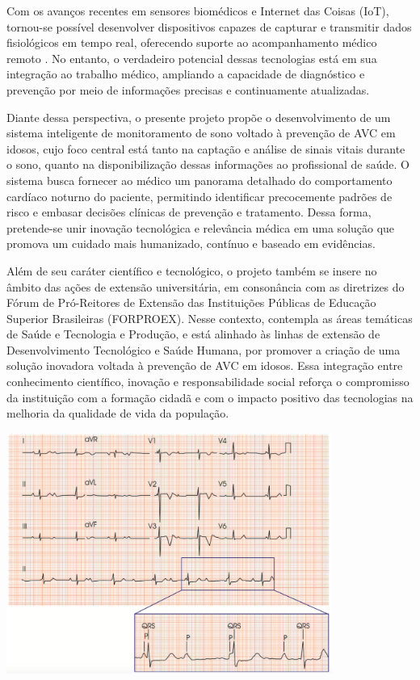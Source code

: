 Com os avanços recentes em sensores biomédicos e Internet das Coisas (IoT), tornou-se possível desenvolver dispositivos capazes de capturar e transmitir dados fisiológicos em tempo real, oferecendo suporte ao acompanhamento médico remoto \parencite{Ansys2022}. No entanto, o verdadeiro potencial dessas tecnologias está em sua integração ao trabalho médico, ampliando a capacidade de diagnóstico e prevenção por meio de informações precisas e continuamente atualizadas.

Diante dessa perspectiva, o presente projeto propõe o desenvolvimento de um sistema inteligente de monitoramento de sono voltado à prevenção de AVC em idosos, cujo foco central está tanto na captação e análise de sinais vitais durante o sono, quanto na disponibilização dessas informações ao profissional de saúde. O sistema busca fornecer ao médico um panorama detalhado do comportamento cardíaco noturno do paciente, permitindo identificar precocemente padrões de risco e embasar decisões clínicas de prevenção e tratamento. Dessa forma, pretende-se unir inovação tecnológica e relevância médica em uma solução que promova um cuidado mais humanizado, contínuo e baseado em evidências.

Além de seu caráter científico e tecnológico, o projeto também se insere no âmbito das ações de extensão universitária, em consonância com as diretrizes do Fórum de Pró-Reitores de Extensão das Instituições Públicas de Educação Superior Brasileiras (FORPROEX). Nesse contexto, contempla as áreas temáticas de Saúde e Tecnologia e Produção, e está alinhado às linhas de extensão de Desenvolvimento Tecnológico e Saúde Humana, por promover a criação de uma solução inovadora voltada à prevenção de AVC em idosos. Essa integração entre conhecimento científico, inovação e responsabilidade social reforça o compromisso da instituição com a formação cidadã e com o impacto positivo das tecnologias na melhoria da qualidade de vida da população.

\begin{center}
\label{fig:introducao-exemplo}
\includegraphics[width=0.8\textwidth]{Illustrations/ondas-p.png}
\vspace{1em}
\end{center}

